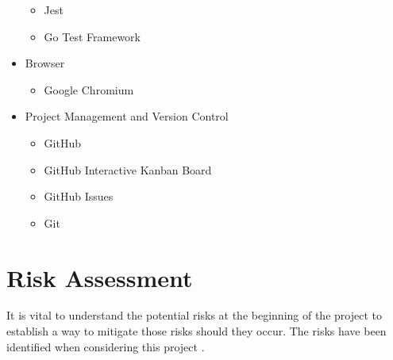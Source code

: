 \begin{itemize}
    \begin{itemize}
        \item Jest
        \item Go Test Framework
    \end{itemize}
    \item Browser
    \begin{itemize}
        \item Google Chromium
    \end{itemize}
    \item Project Management and Version Control
    \begin{itemize}
        \item GitHub
        \item GitHub Interactive Kanban Board
        \item GitHub Issues
        \item Git
    \end{itemize}
\end{itemize}

\section{Risk Assessment}
\label{intro:riskassessment}

It is vital to understand the potential risks at the beginning of the project to establish a way to mitigate those risks should they occur. The risks have been identified when considering this project .

